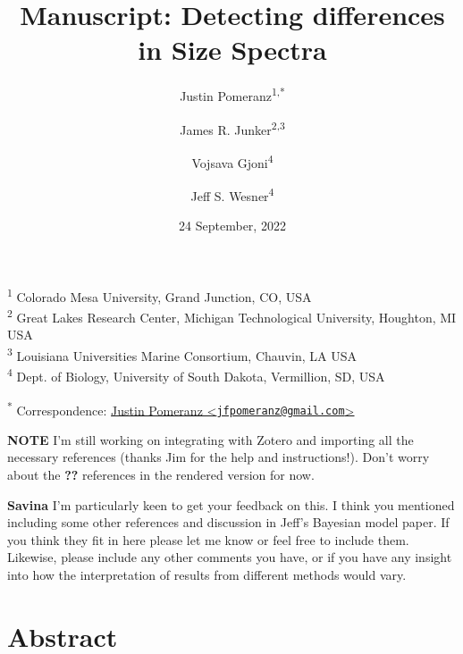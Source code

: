\documentclass[
]{article}
\title{Manuscript: Detecting differences in Size Spectra}
\author{Justin Pomeranz\textsuperscript{1,*} \and James R.
Junker\textsuperscript{2,3} \and Vojsava
Gjoni\textsuperscript{4} \and Jeff S. Wesner\textsuperscript{4}}
\date{24 September, 2022}
\begin{document}
\maketitle

{
\setcounter{tocdepth}{2}
\tableofcontents
}
\textsuperscript{1} Colorado Mesa University, Grand Junction, CO, USA\\
\textsuperscript{2} Great Lakes Research Center, Michigan Technological
University, Houghton, MI USA\\
\textsuperscript{3} Louisiana Universities Marine Consortium, Chauvin,
LA USA\\
\textsuperscript{4} Dept. of Biology, University of South Dakota,
Vermillion, SD, USA

\textsuperscript{*} Correspondence:
\href{mailto:jfpomeranz@gmail.com}{Justin Pomeranz
\textless{}\href{mailto:jfpomeranz@gmail.com}{\nolinkurl{jfpomeranz@gmail.com}}\textgreater{}}

\textbf{NOTE} I'm still working on integrating with Zotero and importing
all the necessary references (thanks Jim for the help and
instructions!). Don't worry about the \textbf{??} references in the
rendered version for now.

\textbf{Savina} I'm particularly keen to get your feedback on this. I
think you mentioned including some other references and discussion in
Jeff's Bayesian model paper. If you think they fit in here please let me
know or feel free to include them. Likewise, please include any other
comments you have, or if you have any insight into how the
interpretation of results from different methods would vary.

\hypertarget{abstract}{%
\section{Abstract}\label{abstract}}
\end{document}
